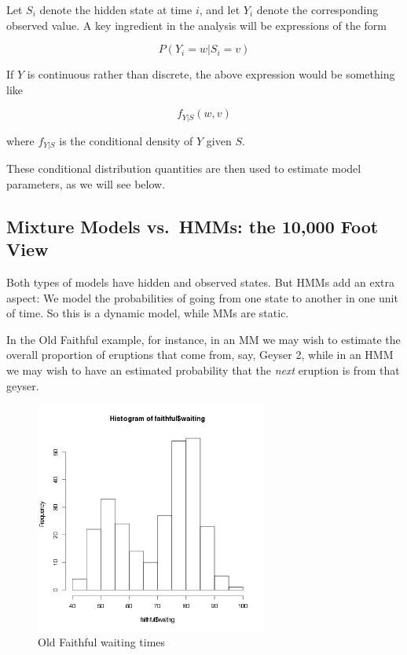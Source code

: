\documentclass[11pt]{article}
\begin{document}
Let $S_i$ denote the hidden state at time $i$, 
and let $Y_i$ denote the corresponding observed value.  A key ingredient
in the analysis will be expressions of the form

\begin{equation}
P(Y_i = w | S _i = v)
\end{equation}

If $Y$ is continuous rather than discrete, the above expression would be
something like

\begin{equation}
f_{Y|S} (w,v) 
\end{equation}

where $f_{Y|S}$ is the conditional density of $Y$ given $S$.

These conditional distribution quantities are then used to estimate
model parameters, as we will see below.

\subsection{Mixture Models vs.\ HMMs: the 10,000 Foot View}

Both types of models have hidden and observed states.  But HMMs add an
extra aspect:  We model the probabilities of going from one state to
another in one unit of time.  So this is a dynamic model, while MMs are
static. 

In the Old Faithful example, for instance, in an MM we may wish to
estimate the overall proportion of eruptions that come from, say, Geyser
2, while in an HMM we may wish to have an estimated probability that the
\textit{next} eruption is from that geyser.

\begin{figure}[tb]
\centerline{
\includegraphics[width=3.0in]{Faithful.jpg}
}
\caption{Old Faithful waiting times}
\label{faithfulhist}
\end{figure}
\end{document}
